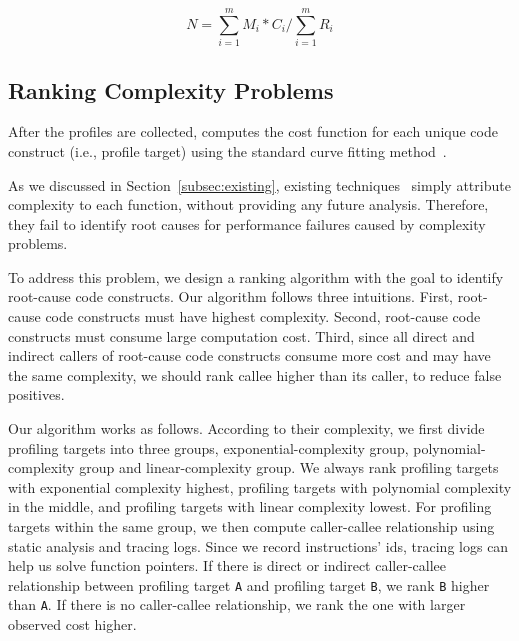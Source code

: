 {{%
\begin{equation} \label{eq:mark}
N = \sum\limits_{i=1}^m M_i*C_i\Big/\sum\limits_{i=1}^m R_i
\end{equation}

\subsection{Ranking Complexity Problems}

After the profiles are collected, \Tool computes
the cost function for each unique code construct
(i.e., profile target) using the standard curve fitting 
method~\cite{curve-fitting,curve-bounding}. 

 
As we discussed in Section~\ref{subsec:existing}, 
existing techniques~\cite{Aprof1,Aprof2,AlgoProf} 
simply attribute complexity to each function, 
without providing any future analysis. 
Therefore, they fail to identify root causes for 
performance failures caused by complexity problems. 

To address this problem, we design a ranking algorithm 
with the goal to identify root-cause code constructs.
Our algorithm follows three intuitions. 
First, root-cause code constructs must have highest complexity.
Second, root-cause code constructs must consume large computation cost.
Third, since all direct and indirect callers of root-cause code constructs 
consume more cost and may have the same complexity, 
we should rank callee higher than its caller, 
to reduce false positives. 


Our algorithm works as follows. 
According to their complexity, 
we first divide profiling targets into three groups, 
exponential-complexity group, 
polynomial-complexity group and linear-complexity group.
We always rank profiling targets with exponential complexity highest,
profiling targets with polynomial complexity in the middle,
and profiling targets with linear complexity lowest. 
For profiling targets within the same group, 
we then compute caller-callee relationship using static analysis and tracing logs.
Since we record instructions' ids, tracing logs can help us solve function pointers. 
If there is direct or indirect caller-callee relationship 
between profiling target \texttt{A}
and profiling target \texttt{B}, we rank \texttt{B} higher than \texttt{A}.
If there is no caller-callee relationship,
we rank the one with larger observed cost higher.


}}
